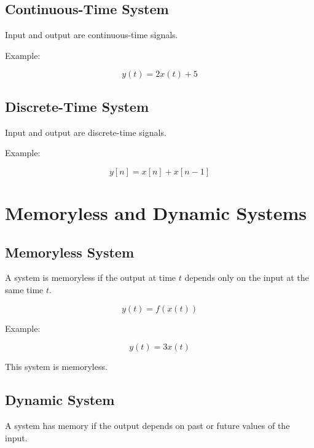 
\subsection{Continuous-Time System}

Input and output are continuous-time signals.

Example:

\[
y(t)=2x(t)+5
\]


\subsection{Discrete-Time System}

Input and output are discrete-time signals.

Example:

\[
y[n]=x[n]+x[n-1]
\]


\section{Memoryless and Dynamic Systems}


\subsection{Memoryless System}

A system is memoryless if the output at time \(t\) depends only on the input at
the same time \(t\).

\[
\boxed{
y(t)=f(x(t))
}
\]

Example:

\[
y(t)=3x(t)
\]

This system is memoryless.


\subsection{Dynamic System}

A system has memory if the output depends on past or future values of the input.

